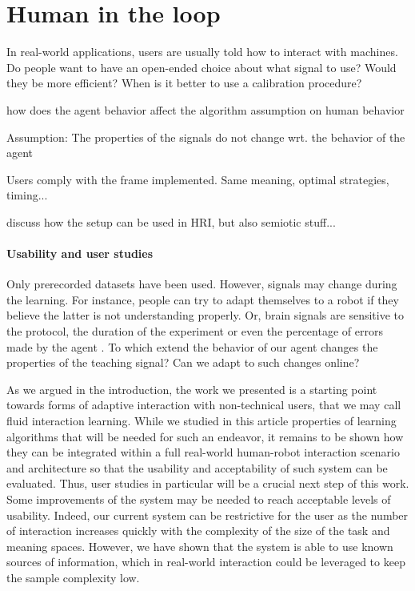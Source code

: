 \section{Human in the loop}
\label{chapter:limitations:userstudies}


In real-world applications, users are usually told how to interact with machines. Do people want to have an open-ended choice about what signal to use? Would they be more efficient? When is it better to use a calibration procedure?

how does the agent behavior affect the algorithm assumption on human behavior

Assumption: The properties of the signals do not change wrt. the behavior of the agent

Users comply with the frame implemented. Same meaning, optimal strategies, timing...

discuss how the setup can be used in HRI, but also semiotic stuff...

\paragraph{Usability and user studies}

Only prerecorded datasets have been used. However, signals may change during the learning. For instance, people can try to adapt themselves to a robot if they believe the latter is not understanding properly. Or, brain signals are sensitive to the protocol, the duration of the experiment or even the percentage of errors made by the agent \cite{chavarriaga2010learning}. To which extend the behavior of our agent changes the properties of the teaching signal? Can we adapt to such changes online? 

As we argued in the introduction, the work we presented is a starting point towards forms of adaptive interaction with non-technical users, that we may call fluid interaction learning. While we studied in this article properties of learning algorithms that will be needed for such an endeavor, it remains to be shown how they can be integrated within a full real-world human-robot interaction scenario and architecture so that the usability and acceptability of such system can be evaluated. Thus, user studies in particular will be a crucial next step of this work. Some improvements of the system may be needed to reach acceptable levels of usability.
Indeed, our current system can be restrictive for the user as the number of interaction increases quickly with the complexity of the size of the task and meaning spaces. However, we have shown that the system is able to use known sources of information, which in real-world interaction could be leveraged to keep the sample complexity low.

